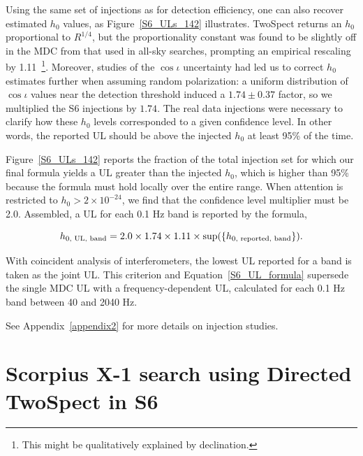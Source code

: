 Using the same set of injections as for detection efficiency, one can also recover estimated $h_0$ values, as Figure~\ref{S6_ULs_142} illustrates.
TwoSpect returns an $h_0$ proportional to $R^{1/4}$, but the proportionality constant was found to be slightly off in the MDC from that used in all-sky searches, prompting an empirical rescaling by 1.11~\footnote{This might be qualitatively explained by declination.}.
Moreover, studies of the $\cos \iota$ uncertainty had led us to correct $h_0$ estimates further when assuming random polarization: a uniform distribution of $\cos \iota$ values near the detection threshold induced a $1.74 \pm 0.37$ factor, so we multiplied the S6 injections by $1.74$.
The real data injections were necessary to clarify how these $h_0$ levels corresponded to a given confidence level. 
In other words, the reported UL should be above the injected $h_0$ at least 95\% of the time.

Figure~\ref{S6_ULs_142} reports the fraction of the total injection set for which our final formula yields a UL greater than the injected $h_0$, which is higher than 95\% because the formula must hold locally over the entire range.
When attention is restricted to $h_0 > 2\times10^{-24}$, we find that the confidence level multiplier must be 2.0.
Assembled, a UL for each 0.1 Hz band is reported by the formula,

\begin{equation}
h_{0,\textup{ UL, band}} = 2.0 \times 1.74 \times 1.11 \times \textup{sup}(\{h_{0, \textup{ reported, band}}\}).
\label{S6_UL_formula}
\end{equation}

\noindent With coincident analysis of interferometers, the lowest UL reported for a band is taken as the joint UL.
This criterion and Equation~\ref{S6_UL_formula} supersede the single MDC UL with a frequency-dependent UL, calculated for each 0.1 Hz band between 40 and 2040 Hz.

See Appendix~\ref{appendix2} for more details on injection studies.


        \section{Scorpius X-1 search using Directed TwoSpect in S6}
        \label{directed_results}
 
